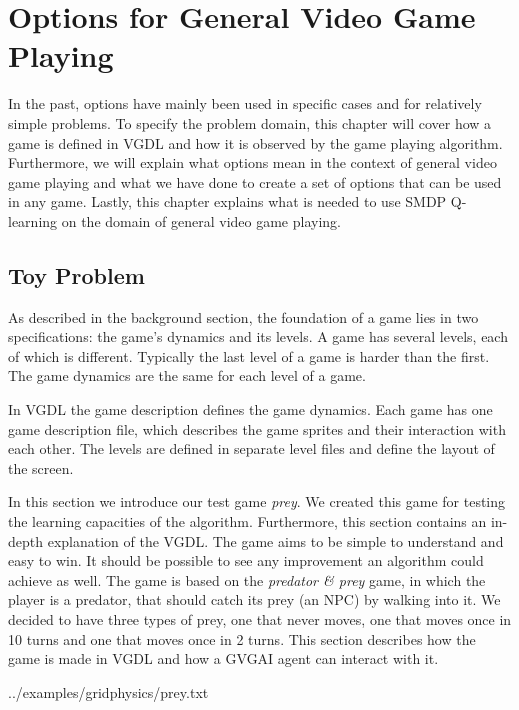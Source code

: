 \chapter{Options for General Video Game Playing}

In the past, options have mainly been used in specific cases and for relatively
simple problems. To specify the problem domain, this chapter will cover how a
game is defined in VGDL and how it is observed by the game playing algorithm.
Furthermore, we will explain what options mean in the context of general video
game playing and what we have done to create a set of options that can be used
in any game. Lastly, this chapter explains what is needed to use SMDP Q-learning
on the domain of general video game playing.

\section{Toy Problem}

As described in the background section, the foundation of a game lies in two
specifications: the game's dynamics and its levels. A game has several levels,
each of which is different.  Typically the last level of a game is harder than
the first.  The game dynamics are the same for each level of a game. 

In VGDL the game description defines the game dynamics. Each game has one game
description file, which describes the game sprites and their interaction with
each other. The levels are defined in separate level files and define the layout
of the screen.

In this section we introduce our test game \emph{prey}. We created this game
for testing the learning capacities of the algorithm. Furthermore, this section
contains an in-depth explanation of the VGDL. The game aims to be simple to
understand and easy to win. It should be possible to see any improvement an
algorithm could achieve as well. The game is based on the \emph{predator \&
prey} game, in which the player is a predator, that should catch its prey (an
NPC) by walking into it. We decided to have three types of prey, one that never
moves, one that moves once in 10 turns and one that moves once in 2 turns. This
section describes how the game is made in VGDL and how a GVGAI agent can
interact with it.

%
{../examples/gridphysics/prey.txt}

